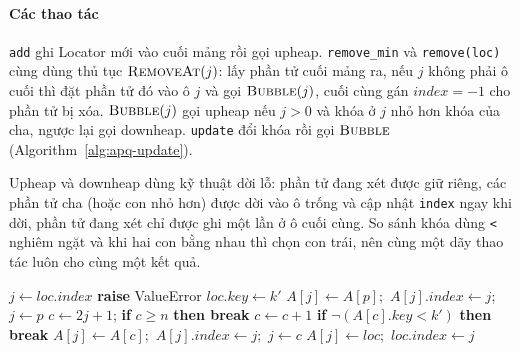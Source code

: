 \paragraph{Các thao tác}
\texttt{add} ghi Locator mới vào cuối mảng rồi gọi upheap. \texttt{remove\_min} và \texttt{remove(loc)} cùng dùng thủ tục $\textsc{RemoveAt}(j)$: lấy phần tử cuối mảng ra, nếu $j$ không phải ô cuối thì đặt phần tử đó vào ô $j$ và gọi $\textsc{Bubble}(j)$, cuối cùng gán $\mathit{index}=-1$ cho phần tử bị xóa. $\textsc{Bubble}(j)$ gọi upheap nếu $j>0$ và khóa ở $j$ nhỏ hơn khóa của cha, ngược lại gọi downheap. \texttt{update} đổi khóa rồi gọi $\textsc{Bubble}$ (Algorithm~\ref{alg:apq-update}).

Upheap và downheap dùng kỹ thuật dời lỗ: phần tử đang xét được giữ riêng, các phần tử cha (hoặc con nhỏ hơn) được dời vào ô trống và cập nhật \texttt{index} ngay khi dời, phần tử đang xét chỉ được ghi một lần ở ô cuối cùng. So sánh khóa dùng \texttt{<} nghiêm ngặt và khi hai con bằng nhau thì chọn con trái, nên cùng một dãy thao tác luôn cho cùng một kết quả.

\begin{algorithm}[t]
\caption{$\textsc{Update}(\mathit{loc}, k')$ của AdaptableHeapPQ}
\label{alg:apq-update}
\begin{algorithmic}[1]
  \State $j \gets \mathit{loc.index}$
    \State \textbf{raise} ValueError 
  \EndIf
  \State $\mathit{loc.key} \gets k'$
      \State $A[j] \gets A[p]$;\ $A[j].\mathit{index} \gets j$;\ $j \gets p$
    \EndWhile
  \Else
    \Loop {}
      \State $c \gets 2j+1$; \textbf{if} $c \ge n$ \textbf{then break}
       \State $c \gets c+1$ \EndIf
      \State \textbf{if} $\neg(A[c].\mathit{key} < k')$ \textbf{then break}
      \State $A[j] \gets A[c]$;\ $A[j].\mathit{index} \gets j$;\ $j \gets c$
    \EndLoop
  \EndIf
  \State $A[j] \gets \mathit{loc}$;\ $\mathit{loc.index} \gets j$
\EndProcedure
\end{algorithmic}
\end{algorithm}


